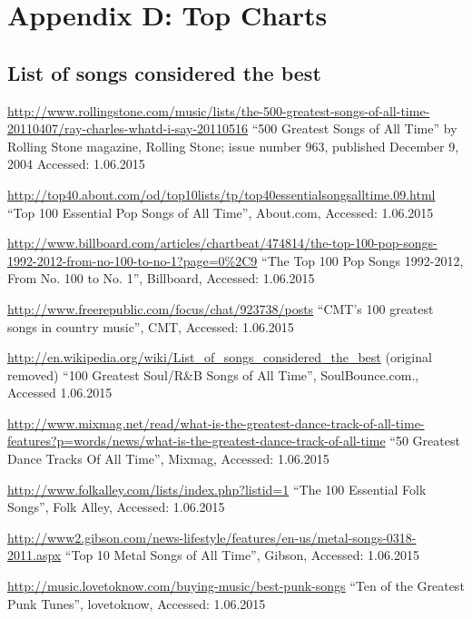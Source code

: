 
\chapter{Appendix D: Top Charts} %

\label{AppendixD} %


\section{List of songs considered the best}
\label{sec:topcharts}


\url{http://www.rollingstone.com/music/lists/the-500-greatest-songs-of-all-time-20110407/ray-charles-whatd-i-say-20110516}
``500 Greatest Songs of All Time'' by Rolling Stone magazine, Rolling Stone; issue number 963, published December 9, 2004 Accessed: 1.06.2015

\url{http://top40.about.com/od/top10lists/tp/top40essentialsongsalltime.09.html}
``Top 100 Essential Pop Songs of All Time'', About.com, Accessed: 1.06.2015

\url{http://www.billboard.com/articles/chartbeat/474814/the-top-100-pop-songs-1992-2012-from-no-100-to-no-1?page=0%2C9}
``The Top 100 Pop Songs 1992-2012, From No. 100 to No. 1'', Billboard, Accessed: 1.06.2015

\url{http://www.freerepublic.com/focus/chat/923738/posts}
``CMT's 100 greatest songs in country music'', CMT, Accessed: 1.06.2015

\url{http://en.wikipedia.org/wiki/List_of_songs_considered_the_best} (original removed)
``100 Greatest Soul/R\&B Songs of All Time'', SoulBounce.com., Accessed 1.06.2015

\url{http://www.mixmag.net/read/what-is-the-greatest-dance-track-of-all-time-features?p=words/news/what-is-the-greatest-dance-track-of-all-time}
``50 Greatest Dance Tracks Of All Time'', Mixmag, Accessed: 1.06.2015

\url{http://www.folkalley.com/lists/index.php?listid=1}
``The 100 Essential Folk Songs'', Folk Alley, Accessed: 1.06.2015

\url{http://www2.gibson.com/news-lifestyle/features/en-us/metal-songs-0318-2011.aspx}
``Top 10 Metal Songs of All Time'', Gibson, Accessed: 1.06.2015

\url{http://music.lovetoknow.com/buying-music/best-punk-songs}
``Ten of the Greatest Punk Tunes'', lovetoknow, Accessed: 1.06.2015


